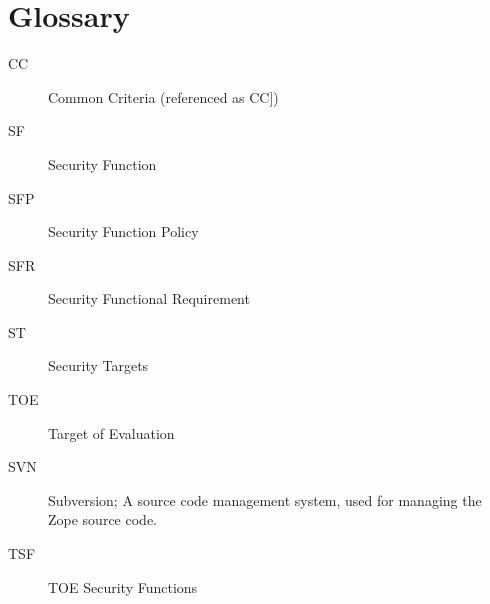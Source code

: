 \documentclass[12pt,english]{scrbook}
\begin{document}



\chapter{Glossary}

\begin{description}

  \item[CC] Common Criteria (referenced as CC])
  \item[SF] Security Function
  \item[SFP] Security Function Policy
  \item[SFR] Security Functional Requirement
  \item[ST] Security Targets
  \item[TOE] Target of Evaluation
  \item[SVN] Subversion; A source code management system, used for managing the Zope source code.
  \item[TSF] TOE Security Functions

\end{description} 

\end{document}
